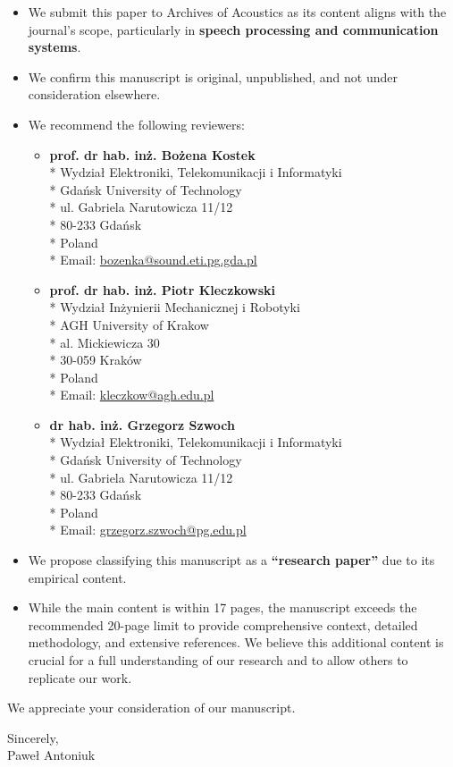\documentclass[a4paper,12pt]{article}
\begin{document}
\begin{itemize}
  \item We submit this paper to Archives of Acoustics as its content aligns with the journal's scope, particularly in \textbf{speech processing and communication systems}.
  \item We confirm this manuscript is original, unpublished, and not under consideration elsewhere.
  \item We recommend the following reviewers:
        \begin{itemize}
          \item \textbf{prof. dr hab. inż. Bożena Kostek} \\*
          Wydział Elektroniki, Telekomunikacji i Informatyki \\*
          Gdańsk University of Technology \\*
          ul. Gabriela Narutowicza 11/12 \\*
          80-233 Gdańsk \\*
          Poland \\*
          Email: \href{mailto:bozenka@sound.eti.pg.gda.pl}{bozenka@sound.eti.pg.gda.pl}
          \item \textbf{prof. dr hab. inż. Piotr Kleczkowski} \\*
          Wydział Inżynierii Mechanicznej i Robotyki \\*
          AGH University of Krakow \\*
          al. Mickiewicza 30 \\*
          30-059 Kraków \\*
          Poland \\*
          Email: \href{mailto:kleczkow@agh.edu.pl}{kleczkow@agh.edu.pl}
          \item \textbf{dr hab. inż. Grzegorz Szwoch} \\*
          Wydział Elektroniki, Telekomunikacji i Informatyki \\*
          Gdańsk University of Technology \\*
          ul. Gabriela Narutowicza 11/12 \\*
          80-233 Gdańsk \\*
          Poland \\*
          Email: \href{mailto:grzegorz.szwoch@pg.edu.pl}{grzegorz.szwoch@pg.edu.pl}
        \end{itemize}
  \item We propose classifying this manuscript as a \textbf{``research paper''} due to its empirical content.
  \item While the main content is within 17 pages, the manuscript exceeds the recommended 20-page limit to provide comprehensive context, detailed methodology, and extensive references. We believe this additional content is crucial for a full understanding of our research and to allow others to replicate our work.
\end{itemize}

We appreciate your consideration of our manuscript.

\vspace{1cm}

Sincerely, \\
Paweł Antoniuk
\end{document}

